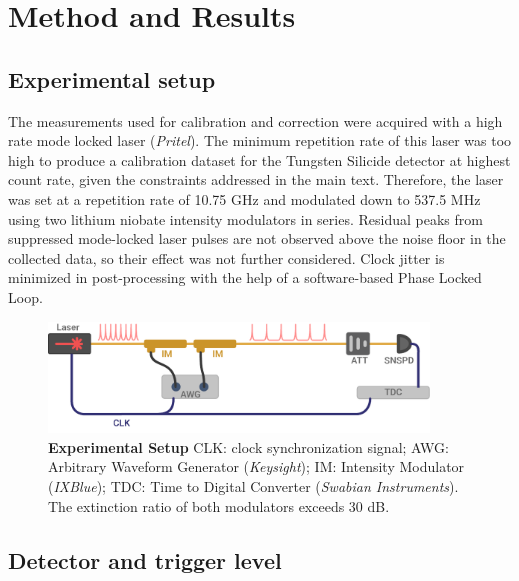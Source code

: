 \documentclass[11pt]{caltech_thesis} %
\begin{document}
\hypertarget{method-and-results}{%
\section{Method and Results}\label{method-and-results}}

\hypertarget{experimental-setup}{%
\subsection{Experimental setup}\label{experimental-setup}}

The measurements used for calibration and correction were acquired with a high rate mode locked laser (\emph{Pritel}). The minimum repetition rate of this laser was too high to produce a calibration dataset for the Tungsten Silicide detector at highest count rate, given the constraints addressed in the main text. Therefore, the laser was set at a repetition rate of 10.75 GHz and modulated down to 537.5 MHz using two lithium niobate intensity modulators in series. Residual peaks from suppressed mode-locked laser pulses are not observed above the noise floor in the collected data, so their effect was not further considered. Clock jitter is minimized in post-processing with the help of a software-based Phase Locked Loop.

\hypertarget{fig:jitterate_exp_setup}{%
\begin{figure}
\centering
\includegraphics[width=0.9\textwidth,height=\textheight]{./chapter_03/figs/supplemental_expirement_light.pdf}
\caption[{Time walk experiment setup}]{\textbf{Experimental Setup} CLK: clock synchronization signal; AWG: Arbitrary Waveform Generator (\emph{Keysight}); IM: Intensity Modulator (\emph{IXBlue}); TDC: Time to Digital Converter (\emph{Swabian Instruments}). The extinction ratio of both modulators exceeds 30 dB.}
\label{fig:jitterate_exp_setup}
\end{figure}
}

\hypertarget{detector-and-trigger-level}{%
\subsection{Detector and trigger level}\label{detector-and-trigger-level}}
\end{document}
